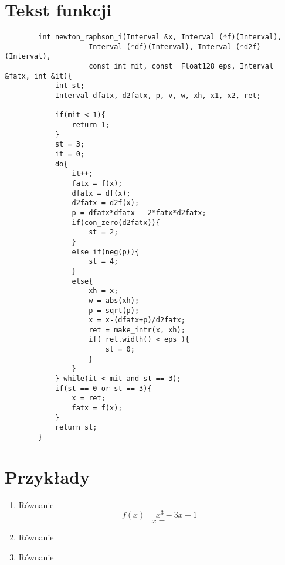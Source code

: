 \documentclass[11pt]{article}
\begin{document}
\section{Tekst funkcji}
    \begin{verbatim}
        int newton_raphson_i(Interval &x, Interval (*f)(Interval), 
                    Interval (*df)(Interval), Interval (*d2f)(Interval),
                    const int mit, const _Float128 eps, Interval &fatx, int &it){
            int st;
            Interval dfatx, d2fatx, p, v, w, xh, x1, x2, ret;

            if(mit < 1){
                return 1;
            }
            st = 3;
            it = 0;
            do{
                it++;
                fatx = f(x);
                dfatx = df(x);
                d2fatx = d2f(x);
                p = dfatx*dfatx - 2*fatx*d2fatx;
                if(con_zero(d2fatx)){
                    st = 2;
                }
                else if(neg(p)){
                    st = 4;
                }
                else{
                    xh = x;
                    w = abs(xh);
                    p = sqrt(p);
                    x = x-(dfatx+p)/d2fatx;
                    ret = make_intr(x, xh);
                    if( ret.width() < eps ){
                        st = 0;
                    }
                }
            } while(it < mit and st == 3);
            if(st == 0 or st == 3){
                x = ret;
                fatx = f(x);
            }
            return st;
        } 
    \end{verbatim}

\pagebreak
\section{Przykłady}
    \begin{enumerate}
        \item Równanie $$f(x) = x^3 - 3x -1$$ $$x=$$
        \item Równanie
        \item Równanie
    \end{enumerate}
\pagebreak
\tableofcontents
\end{document}
